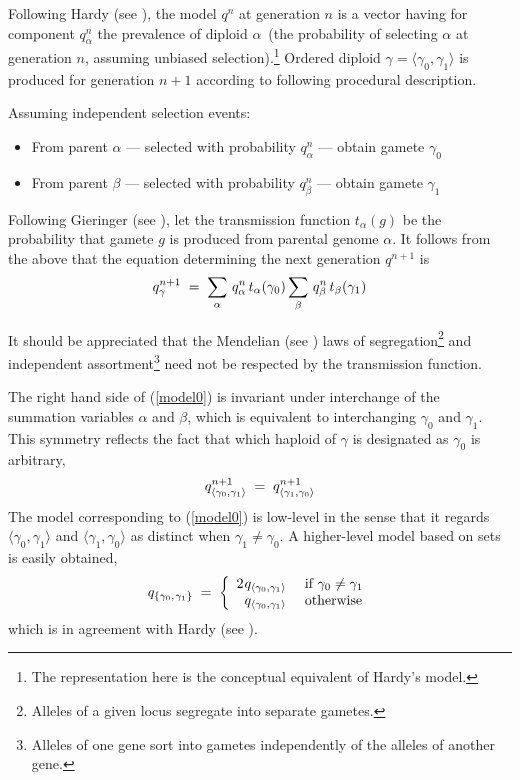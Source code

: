 Following Hardy (see \cite{Hardy1908}), the model $q^{n}$ at generation $n$
is a vector having for component $q_\alpha^n$ the prevalence of
diploid $\alpha\,$ (the probability of selecting $\alpha$ \nudge at
generation $n$, assuming unbiased selection).\footnote{The
  representation here is the conceptual equivalent of Hardy's model.}
Ordered diploid $\gamma = \langle \gamma_0, \gamma_1 \rangle$ is
produced for generation $n+1$ according to following procedural
description.

  Assuming independent selection events:
\begin{itemize}
\item From parent $\alpha$ --- selected with probability
  $q_\alpha^n$ --- obtain gamete $\gamma_0$
\item From parent $\beta$ --- selected with probability $q_\beta^n$
  --- obtain gamete $\gamma_1$
\end{itemize}
Following Gieringer (see \cite{Geiringer1944}), let the transmission
function $t_\alpha(g)$ be the probability that gamete $g$ is produced
from parental genome $\alpha$.  It follows from the above that the
equation determining the next generation $q^{n+1}$ is
\begin{equation}
\label{model0}
q_\gamma^{n+1} \; = \;
\sum_{\alpha} \, q_\alpha^n \, t_\alpha(\gamma_0) 
\sum_{\beta} \,q_\beta^n \, t_\beta(\gamma_1)\\[-.05in]
\end{equation}

It should be appreciated that the Mendelian (see \cite{Mendel1866}) laws of
segregation\footnote{Alleles of a given locus segregate into separate
  gametes.} and independent assortment\footnote{Alleles of one gene
  sort into gametes independently of the alleles of another gene.}
need not be respected by the transmission function.


The right hand side of (\ref{model0}) is invariant under interchange
of the summation variables $\alpha$ and $\beta$, which is equivalent
to interchanging $\gamma_0$ and $\gamma_1$.  This symmetry reflects
the fact that which haploid of $\gamma$ is designated as $\gamma_0$ is
arbitrary,\\[-.05in]
\[
q_{\langle \gamma_0, \gamma_1 \rangle}^{n+1} \; = \;
q_{\langle \gamma_1, \gamma_0 \rangle}^{n+1}\\[.1in]
\]
The model corresponding to (\ref{model0}) is low-level in the sense
that it regards $\langle \gamma_0, \gamma_1 \rangle$ and $\langle
\gamma_1, \gamma_0 \rangle$ as distinct when $\gamma_1 \neq \gamma_0$.
A higher-level model based on sets is easily obtained,
\[
q_{\{\gamma_0, \nudge \gamma_1\}} \; = \; \left\{
\begin{array}{ll}
2 \nudge q_{\langle \gamma_0, \gamma_1 \rangle} & \mbox{ if $\gamma_0 \neq \gamma_1$}\\
\phantom{2 \nudge }q_{\langle \gamma_0, \gamma_1 \rangle} & \mbox{ otherwise}
\end{array}
\right.\\[.05in]
\]
which is in agreement with Hardy (see \cite{Hardy1908}).

